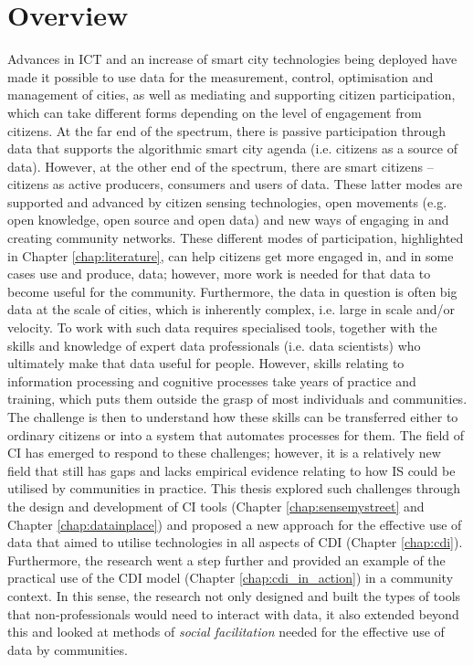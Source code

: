 \section{Overview}
Advances in ICT and an increase of smart city technologies being deployed have made it possible to use data for the measurement, control, optimisation and management of cities, as well as mediating and supporting citizen participation, which can take different forms depending on the level of engagement from citizens. At the far end of the spectrum, there is passive participation through data that supports the algorithmic smart city agenda (i.e. citizens as a source of data). However, at the other end of the spectrum, there are smart citizens -- citizens as active producers, consumers and users of data. These latter modes are supported and advanced by citizen sensing technologies, open movements (e.g. open knowledge, open source and open data) and new ways of engaging in and creating community networks. These different modes of participation, highlighted in Chapter \ref{chap:literature}, can help citizens get more engaged in, and in some cases use and produce, data; however, more work is needed for that data to become useful for the community. Furthermore, the data in question is often big data at the scale of cities, which is inherently complex, i.e. large in scale and/or velocity. To work with such data requires specialised tools, together with the skills and knowledge of expert data professionals (i.e. data scientists) who ultimately make that data useful for people. However, skills relating to information processing and cognitive processes take years of practice and training, which puts them outside the grasp of most individuals and communities. The challenge is then to understand how these skills can be transferred either to ordinary citizens or into a system that automates processes for them. The field of CI has emerged to respond to these challenges; however, it is a relatively new field that still has gaps and lacks empirical evidence relating to how IS could be utilised by communities in practice. This thesis explored such challenges through the design and development of CI tools (Chapter \ref{chap:sensemystreet} and Chapter \ref{chap:datainplace}) and proposed a new approach for the effective use of data that aimed to utilise technologies in all aspects of CDI (Chapter \ref{chap:cdi}). Furthermore, the research went a step further and provided an example of the practical use of the CDI model (Chapter \ref{chap:cdi_in_action}) in a community context. In this sense, the research not only designed and built the types of tools that non-professionals would need to interact with data, it also extended beyond this and looked at methods of \textit{social facilitation} needed for the effective use of data by communities.


